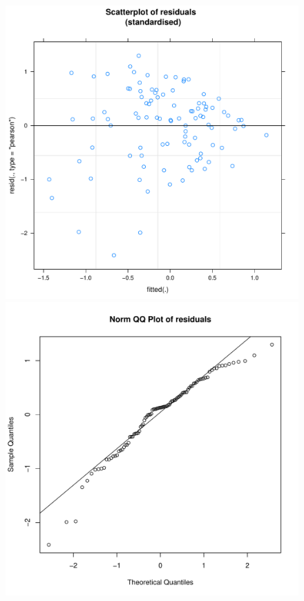 \begin{CJK}{UTF8}{gbsn}
\begin{figure}[!htbp]
              \includegraphics[scale =.4]{images/MLM3aScatter.pdf}
              \includegraphics[scale =.4]{images/MLM3aQQNorm.pdf}

\end{figure}
\end{CJK}
